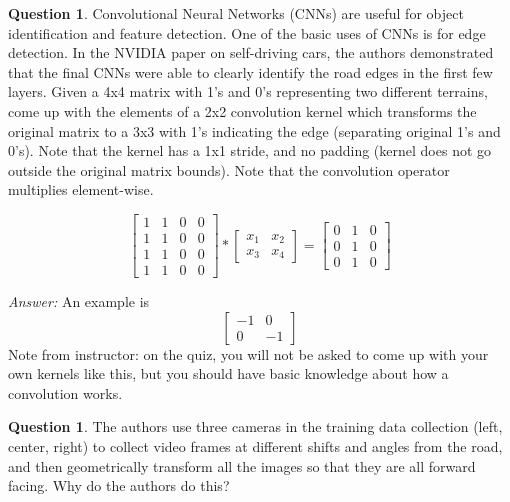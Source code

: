 \documentclass{article}
\theoremstyle{definition}
\newtheorem{question}[thm]{Question}
\newenvironment{answer}{\noindent\textit{Answer:}}{}
\begin{document}
\begin{question}
Convolutional Neural Networks (CNNs) are useful for object identification and feature detection. One of the basic uses of CNNs is for edge detection. In the NVIDIA paper on self-driving cars, the authors demonstrated that the final CNNs were able to clearly identify the road edges in the first few layers. Given a 4x4 matrix with 1’s and 0’s representing two different terrains, come up with the elements of a 2x2 convolution kernel which transforms the original matrix to a 3x3 with 1’s indicating the edge (separating original 1’s and 0’s). Note that the kernel has a 1x1 stride, and no padding (kernel does not go outside the original matrix bounds). Note that the convolution operator multiplies element-wise.

\begin{equation}
    \begin{bmatrix}
        1 & 1 & 0 & 0 \\
        1 & 1 & 0 & 0 \\
        1 & 1 & 0 & 0 \\
        1 & 1 & 0 & 0
    \end{bmatrix} * 
    \begin{bmatrix}
        x_1 & x_2 \\
        x_3 & x_4
    \end{bmatrix} = 
    \begin{bmatrix}
        0 & 1 & 0 \\
        0 & 1 & 0 \\
        0 & 1 & 0
    \end{bmatrix}
\end{equation}
\end{question}

\begin{answer}
    An example is
    \begin{equation}
        \begin{bmatrix}
            -1 & 0 \\
            0 & -1
        \end{bmatrix}
    \end{equation}
    Note from instructor: on the quiz, you will not be asked to come up with your own kernels like this, but you should have basic knowledge about how a convolution works.
\end{answer}

\begin{question}
The authors use three cameras in the training data collection (left, center, right) to collect video frames at different shifts and angles from the road, and then geometrically transform all the images so that they are all forward facing. Why do the authors do this?
\end{question}
\end{document}
